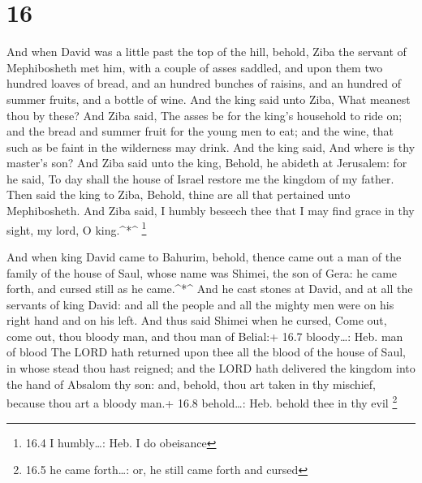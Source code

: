 \hypertarget{section-15}{%
\section{16}\label{section-15}}

 And when David was a little past the top of the hill,
behold, Ziba the servant of Mephibosheth met him, with a couple of asses
saddled, and upon them two hundred loaves of bread, and an hundred
bunches of raisins, and an hundred of summer fruits, and a bottle of
wine.  And the king said unto Ziba, What meanest thou by
these? And Ziba said, The asses be for the king's household to ride on;
and the bread and summer fruit for the young men to eat; and the wine,
that such as be faint in the wilderness may drink.  And the
king said, And where is thy master's son? And Ziba said unto the king,
Behold, he abideth at Jerusalem: for he said, To day shall the house of
Israel restore me the kingdom of my father.  Then said the
king to Ziba, Behold, thine are all that pertained unto Mephibosheth.
And Ziba said, I humbly beseech thee that I may find grace in thy sight,
my lord, O king.\^{}*\^{} \footnote{16.4 I humbly\ldots: Heb. I do
  obeisance}

 And when king David came to Bahurim, behold, thence came
out a man of the family of the house of Saul, whose name was Shimei, the
son of Gera: he came forth, and cursed still as he came.\^{}*\^{}
 And he cast stones at David, and at all the servants of
king David: and all the people and all the mighty men were on his right
hand and on his left.  And thus said Shimei when he cursed,
Come out, come out, thou bloody man, and thou man of Belial:+ 16.7
bloody\ldots: Heb. man of blood  The LORD hath returned upon
thee all the blood of the house of Saul, in whose stead thou hast
reigned; and the LORD hath delivered the kingdom into the hand of
Absalom thy son: and, behold, thou art taken in thy mischief, because
thou art a bloody man.+ 16.8 behold\ldots: Heb. behold thee in thy evil
\footnote{16.5 he came forth\ldots: or, he still came forth and cursed}

